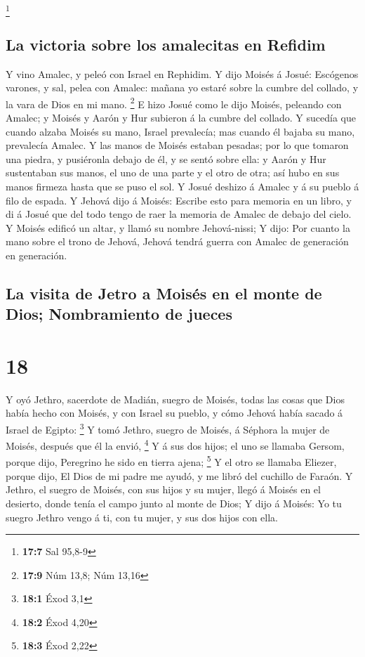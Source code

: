 \footnote{\textbf{17:7} Sal 95,8-9}

\hypertarget{la-victoria-sobre-los-amalecitas-en-refidim}{%
\subsection{La victoria sobre los amalecitas en
Refidim}\label{la-victoria-sobre-los-amalecitas-en-refidim}}

 Y vino Amalec, y peleó con Israel en Rephidim.
 Y dijo Moisés á Josué: Escógenos varones, y sal, pelea
con Amalec: mañana yo estaré sobre la cumbre del collado, y la vara de
Dios en mi mano. \footnote{\textbf{17:9} Núm 13,8; Núm 13,16}
 E hizo Josué como le dijo Moisés, peleando con Amalec; y
Moisés y Aarón y Hur subieron á la cumbre del collado.  Y
sucedía que cuando alzaba Moisés su mano, Israel prevalecía; mas cuando
él bajaba su mano, prevalecía Amalec.  Y las manos de
Moisés estaban pesadas; por lo que tomaron una piedra, y pusiéronla
debajo de él, y se sentó sobre ella: y Aarón y Hur sustentaban sus
manos, el uno de una parte y el otro de otra; así hubo en sus manos
firmeza hasta que se puso el sol.  Y Josué deshizo á
Amalec y á su pueblo á filo de espada.  Y Jehová dijo á
Moisés: Escribe esto para memoria en un libro, y di á Josué que del todo
tengo de raer la memoria de Amalec de debajo del cielo. 
Y Moisés edificó un altar, y llamó su nombre Jehová-nissi;
 Y dijo: Por cuanto la mano sobre el trono de Jehová,
Jehová tendrá guerra con Amalec de generación en generación.

\hypertarget{la-visita-de-jetro-a-moisuxe9s-en-el-monte-de-dios-nombramiento-de-jueces}{%
\subsection{La visita de Jetro a Moisés en el monte de Dios;
Nombramiento de
jueces}\label{la-visita-de-jetro-a-moisuxe9s-en-el-monte-de-dios-nombramiento-de-jueces}}

\hypertarget{section-17}{%
\section{18}\label{section-17}}

 Y oyó Jethro, sacerdote de Madián, suegro de Moisés,
todas las cosas que Dios había hecho con Moisés, y con Israel su pueblo,
y cómo Jehová había sacado á Israel de Egipto: \footnote{\textbf{18:1}
  Éxod 3,1}  Y tomó Jethro, suegro de Moisés, á Séphora la
mujer de Moisés, después que él la envió, \footnote{\textbf{18:2} Éxod
  4,20}  Y á sus dos hijos; el uno se llamaba Gersom,
porque dijo, Peregrino he sido en tierra ajena; \footnote{\textbf{18:3}
  Éxod 2,22}  Y el otro se llamaba Eliezer, porque dijo,
El Dios de mi padre me ayudó, y me libró del cuchillo de Faraón.
 Y Jethro, el suegro de Moisés, con sus hijos y su mujer,
llegó á Moisés en el desierto, donde tenía el campo junto al monte de
Dios;  Y dijo á Moisés: Yo tu suegro Jethro vengo á ti,
con tu mujer, y sus dos hijos con ella.


